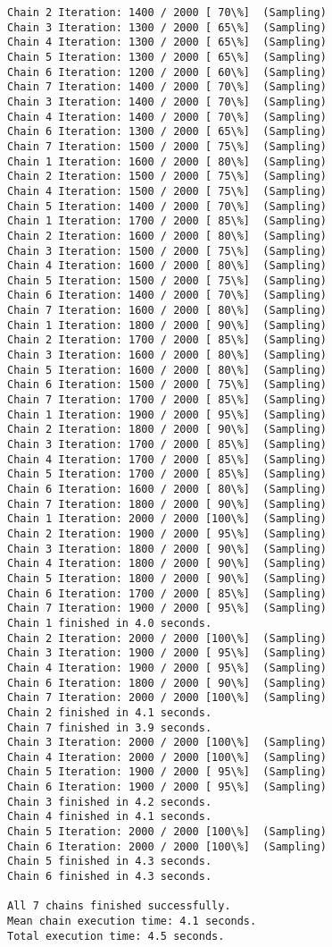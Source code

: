 \documentclass[11pt]{article}
\begin{document}
\begin{Verbatim}[commandchars=\\\{\}]
Chain 2 Iteration: 1400 / 2000 [ 70\%]  (Sampling)
Chain 3 Iteration: 1300 / 2000 [ 65\%]  (Sampling)
Chain 4 Iteration: 1300 / 2000 [ 65\%]  (Sampling)
Chain 5 Iteration: 1300 / 2000 [ 65\%]  (Sampling)
Chain 6 Iteration: 1200 / 2000 [ 60\%]  (Sampling)
Chain 7 Iteration: 1400 / 2000 [ 70\%]  (Sampling)
Chain 3 Iteration: 1400 / 2000 [ 70\%]  (Sampling)
Chain 4 Iteration: 1400 / 2000 [ 70\%]  (Sampling)
Chain 6 Iteration: 1300 / 2000 [ 65\%]  (Sampling)
Chain 7 Iteration: 1500 / 2000 [ 75\%]  (Sampling)
Chain 1 Iteration: 1600 / 2000 [ 80\%]  (Sampling)
Chain 2 Iteration: 1500 / 2000 [ 75\%]  (Sampling)
Chain 4 Iteration: 1500 / 2000 [ 75\%]  (Sampling)
Chain 5 Iteration: 1400 / 2000 [ 70\%]  (Sampling)
Chain 1 Iteration: 1700 / 2000 [ 85\%]  (Sampling)
Chain 2 Iteration: 1600 / 2000 [ 80\%]  (Sampling)
Chain 3 Iteration: 1500 / 2000 [ 75\%]  (Sampling)
Chain 4 Iteration: 1600 / 2000 [ 80\%]  (Sampling)
Chain 5 Iteration: 1500 / 2000 [ 75\%]  (Sampling)
Chain 6 Iteration: 1400 / 2000 [ 70\%]  (Sampling)
Chain 7 Iteration: 1600 / 2000 [ 80\%]  (Sampling)
Chain 1 Iteration: 1800 / 2000 [ 90\%]  (Sampling)
Chain 2 Iteration: 1700 / 2000 [ 85\%]  (Sampling)
Chain 3 Iteration: 1600 / 2000 [ 80\%]  (Sampling)
Chain 5 Iteration: 1600 / 2000 [ 80\%]  (Sampling)
Chain 6 Iteration: 1500 / 2000 [ 75\%]  (Sampling)
Chain 7 Iteration: 1700 / 2000 [ 85\%]  (Sampling)
Chain 1 Iteration: 1900 / 2000 [ 95\%]  (Sampling)
Chain 2 Iteration: 1800 / 2000 [ 90\%]  (Sampling)
Chain 3 Iteration: 1700 / 2000 [ 85\%]  (Sampling)
Chain 4 Iteration: 1700 / 2000 [ 85\%]  (Sampling)
Chain 5 Iteration: 1700 / 2000 [ 85\%]  (Sampling)
Chain 6 Iteration: 1600 / 2000 [ 80\%]  (Sampling)
Chain 7 Iteration: 1800 / 2000 [ 90\%]  (Sampling)
Chain 1 Iteration: 2000 / 2000 [100\%]  (Sampling)
Chain 2 Iteration: 1900 / 2000 [ 95\%]  (Sampling)
Chain 3 Iteration: 1800 / 2000 [ 90\%]  (Sampling)
Chain 4 Iteration: 1800 / 2000 [ 90\%]  (Sampling)
Chain 5 Iteration: 1800 / 2000 [ 90\%]  (Sampling)
Chain 6 Iteration: 1700 / 2000 [ 85\%]  (Sampling)
Chain 7 Iteration: 1900 / 2000 [ 95\%]  (Sampling)
Chain 1 finished in 4.0 seconds.
Chain 2 Iteration: 2000 / 2000 [100\%]  (Sampling)
Chain 3 Iteration: 1900 / 2000 [ 95\%]  (Sampling)
Chain 4 Iteration: 1900 / 2000 [ 95\%]  (Sampling)
Chain 6 Iteration: 1800 / 2000 [ 90\%]  (Sampling)
Chain 7 Iteration: 2000 / 2000 [100\%]  (Sampling)
Chain 2 finished in 4.1 seconds.
Chain 7 finished in 3.9 seconds.
Chain 3 Iteration: 2000 / 2000 [100\%]  (Sampling)
Chain 4 Iteration: 2000 / 2000 [100\%]  (Sampling)
Chain 5 Iteration: 1900 / 2000 [ 95\%]  (Sampling)
Chain 6 Iteration: 1900 / 2000 [ 95\%]  (Sampling)
Chain 3 finished in 4.2 seconds.
Chain 4 finished in 4.1 seconds.
Chain 5 Iteration: 2000 / 2000 [100\%]  (Sampling)
Chain 6 Iteration: 2000 / 2000 [100\%]  (Sampling)
Chain 5 finished in 4.3 seconds.
Chain 6 finished in 4.3 seconds.

All 7 chains finished successfully.
Mean chain execution time: 4.1 seconds.
Total execution time: 4.5 seconds.

    \end{Verbatim}
\end{document}

